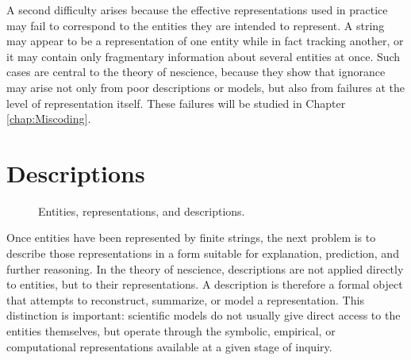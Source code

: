 A second difficulty arises because the effective representations used in practice may fail to correspond to the entities they are intended to represent. A string may appear to be a representation of one entity while in fact tracking another, or it may contain only fragmentary information about several entities at once. Such cases are central to the theory of nescience, because they show that ignorance may arise not only from poor descriptions or models, but also from failures at the level of representation itself. These failures will be studied in Chapter \ref{chap:Miscoding}.

%
%

\section{Descriptions}
\label{sec:intro_descriptions}

\begin{figure}[t]
\centering
{}
\caption{\label{fig:entities_topics_models}Entities, representations, and descriptions.}
\end{figure}

Once entities have been represented by finite strings, the next problem is to describe those representations in a form suitable for explanation, prediction, and further reasoning. In the theory of nescience, descriptions are not applied directly to entities, but to their representations. A description is therefore a formal object that attempts to reconstruct, summarize, or model a representation. This distinction is important: scientific models do not usually give direct access to the entities themselves, but operate through the symbolic, empirical, or computational representations available at a given stage of inquiry.

